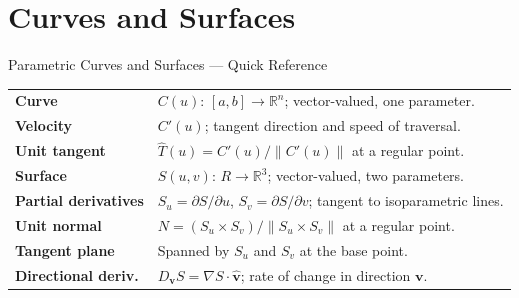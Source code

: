 
\section{Curves and Surfaces}

\begin{toolkitbox}{Parametric Curves and Surfaces --- Quick Reference}
\begin{tabular}{@{}p{}p{}@{}}
\textbf{Curve}               & $C(u):\,[a,b]\to\mathbb{R}^n$; vector-valued, one parameter. \\[4pt]
\textbf{Velocity}            & $C'(u)$; tangent direction and speed of traversal. \\[4pt]
\textbf{Unit tangent}        & $\hat{T}(u) = C'(u)/\|C'(u)\|$ at a regular point. \\[4pt]
\textbf{Surface}             & $S(u,v):\,R\to\mathbb{R}^3$; vector-valued, two parameters. \\[4pt]
\textbf{Partial derivatives} & $S_u = \partial S/\partial u$,\; $S_v = \partial S/\partial v$; tangent to isoparametric lines. \\[4pt]
\textbf{Unit normal}         & $N = (S_u\times S_v)/\|S_u\times S_v\|$ at a regular point. \\[4pt]
\textbf{Tangent plane}       & Spanned by $S_u$ and $S_v$ at the base point. \\[4pt]
\textbf{Directional deriv.}  & $D_{\mathbf{v}}S = \nabla S \cdot \hat{\mathbf{v}}$; rate of change in direction $\mathbf{v}$. \\
\end{tabular}
\end{toolkitbox}



